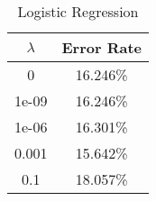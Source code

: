 \begin{center}
\begin{longtable}{|c|c|}
\caption{Logistic Regression}\label{tab:logreg}\\
\hline
$\lambda$ & Error Rate \\
\hline
0 & 16.246\% \\
\hline
1e-09 & 16.246\% \\
\hline
1e-06 & 16.301\% \\
\hline
0.001 & 15.642\% \\
\hline
0.1 & 18.057\% \\
\hline
\hline
\end{longtable}
\end{center}
